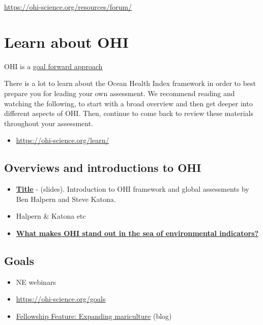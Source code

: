 \documentclass[
]{book}
\providecommand{\tightlist}{%
  \setlength{\itemsep}{0pt}\setlength{\parskip}{0pt}}
\begin{document}
\url{https://ohi-science.org/resources/forum/}

\hypertarget{ohi}{%
\chapter{Learn about OHI}\label{ohi}}

OHI is a \href{https://ohi-science.org/news/goal-forward-approach}{goal forward approach}

There is a lot to learn about the Ocean Health Index framework in order to best prepare you for leading your own assessment. We recommend reading and watching the following, to start with a broad overview and then get deeper into different aspects of OHI. Then, continue to come back to review these materials throughout your assessment.

\begin{itemize}
\tightlist
\item
  \url{https://ohi-science.org/learn/}
\end{itemize}

\hypertarget{overviews-and-introductions-to-ohi}{%
\section{Overviews and introductions to OHI}\label{overviews-and-introductions-to-ohi}}

\begin{itemize}
\tightlist
\item
  \href{link}{\textbf{Title}} - (slides). Introduction to OHI framework and global assessments by Ben Halpern and Steve Katona.
\item
  Halpern \& Katona etc
\item
  \href{https://ohi-science.org/news/goal-forward-approach}{\textbf{What makes OHI stand out in the sea of environmental indicators?}}
\end{itemize}

\hypertarget{goals}{%
\section{Goals}\label{goals}}

\begin{itemize}
\item
  NE webinars
\item
  \url{https://ohi-science.org/goals}
\item
  \href{https://ohi-science.org/news/fellowship-expanding-mariculture}{Fellowship Feature: Expanding mariculture} (blog)
\end{itemize}
\end{document}
